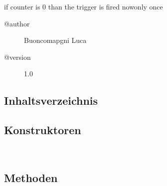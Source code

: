  if counter is 0 than the trigger is \textquotedbl fired now\textquotedbl  only once
\begin{description}
\item[@author] 
Buoncomapgni Luca
\item[@version] 
1.0
\end{description}
\subsection{Inhaltsverzeichnis}
\subsection{Konstruktoren}
\begin{description}
\item[{\label{ontologyFramework.OFEventManagement.OFTimeTriggerManagement.OFTimeTriggerImplementation.TriggFrequently()}}]
~ 
\end{description}
\subsection{Methoden}
\begin{description}
\item[{\label{ontologyFramework.OFEventManagement.OFTimeTriggerManagement.OFTimeTriggerImplementation.TriggFrequently.isCorrectInput(java.util.List<ontologyFramework.OFEventManagement.EventComputedData>)}}]
~ 
\item[{\label{ontologyFramework.OFEventManagement.OFTimeTriggerManagement.OFTimeTriggerImplementation.TriggFrequently.getTrigger(java.util.List<ontologyFramework.OFEventManagement.EventComputedData>,ontologyFramework.OFRunning.OFInvokingManager.OFBuildedListInvoker)}}]
~ 
\end{description}
